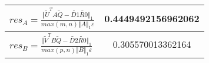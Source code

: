 \begin{example}
{\begin{enumerate}[(1).]
\begin{center}
	\bgroup
	\def\arraystretch{2}%
		\begin{tabular}{| m{}|| c |}
			\hline
    			$res_{A} = \frac{\Vert \tilde{U}^TA\tilde{Q} - \tilde{D1}\tilde{R0}\Vert_1}{max(m,n)\Vert A \Vert_1 \varepsilon}$ & 0.4449492156962062 \\ \hline
				$res_{B} = \frac{\Vert \tilde{V}^TB\tilde{Q} - \tilde{D2}\tilde{R0}\Vert_1}{max(p,n)\Vert B \Vert_1 \varepsilon}$ & 0.305570013362164 \\ 
			\hline
		\end{tabular}
	\egroup
\end{center}

\end{enumerate} 
} \end{example}

    
    
        
        

